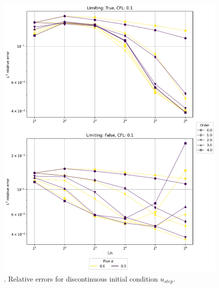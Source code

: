 \begin{figure}[p!]
	\centering
	\includegraphics[width=1.1\textwidth]{../figs/parametric/advection_1D/advection_1D_step_reduced.png}
	\caption{. Relative errors for discontinuous initial
	condition $u_{step}$.}
	\label{fig:adv_conv_1D_step}
\end{figure}
